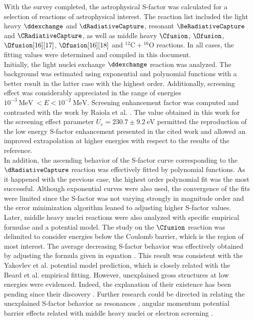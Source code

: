 \documentclass[openany]{book}
\begin{document}
With the survey completed, the astrophysical S-factor was calculated for a selection of reactions of astrophysical interest. The reaction list included the light heavy $\ddexchange$ and $\dRadiativeCapture$, resonant $\BeRadiativeCapture$ and $\CRadiativeCapture$, as well as middle heavy $\Cfusion$, $\Ofusion$, $\Ofusion[16][17]$, $\Ofusion[16][18]$ and $\mathrm{{}^{12}C + {}^{16}O}$ reactions. In all cases, the fitting values were determined and compiled in this document. \\

Initially, the light nuclei exchange $\ddexchange$ reaction was analyzed. The background was estimated using exponential and polynomial functions with a better result in the latter case with the highest order. Additionally, screening effect was considerably appreciated in the range of energies $\mathrm{10^{-3} \ MeV} \ < E < \mathrm{10^{-2} \ MeV }$. Screening enhancement factor was computed and contrasted with the work by Raiola et al. \cite{raiola_migliardi_gyurky_aliotta_formicola_bonetti_broggini_campajola_corvisiero_costantini_et_2002}. The value obtained in this work for the screening effect parameter $U_e = 230.7 \pm 9.2 \ \mathrm{eV}$ permitted the reproduction of the low energy S-factor enhancement presented in the cited work and allowed an improved extrapolation at higher energies with respect to the results of the reference. \\

In addition, the ascending behavior of the S-factor curve corresponding to the $\dRadiativeCapture$ reaction was effectively fitted by polynomial functions. As it happened with the previous case, the highest order polynomial fit was the most successful. Although exponential curves were also used, the convergence of the fits were limited since the S-factor was not varying strongly in magnitude order and the error minimization algorithm leaned to adjusting higher S-factor values. \\

Later, middle heavy nuclei reactions were also analyzed with specific empirical formulae and a potential model. The study on the $\Cfusion$ reaction was delimited to consider energies below the Coulomb barrier, which is the region of most interest. The average decreasing S-factor behavior was effectively obtained by adjusting the formula given in equation \cite{beard_afanasjev_chamon_gasques_wiescher_yakovlev_2010}. This result was consistent with the Yakovlev et al. potential model prediction, which is closely related with the Beard et al. empirical fitting. However, unexplained gross structures at low energies were evidenced. Indeed, the explanation of their existence has been pending since their discovery \cite{chan_bohn_vandenbosch_sielemann_cramer_bernhardt_bhang_chiang_1979}. Further research could be directed in relating the unexplained S-factor behavior as resonances \cite{assuncao_descouvemont_2015, kovar_geesaman_braid_eisen_henning_ophel_paul_rehm_sanders_sperr_et_1979}, angular momentum potential barrier effects related with middle heavy nuclei \cite{esbensen_2012} or electron screening \cite{koyuncu_soylu_2018}. \\
\end{document}
